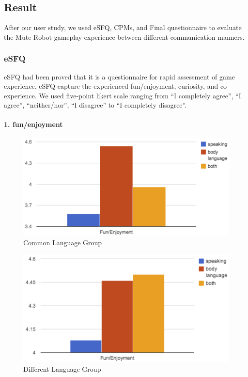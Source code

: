 \subsection{Result}
After our user study, we used eSFQ, CPMs, and Final questionnaire to evaluate the Mute Robot gameplay experience between different communication manners.

\subsubsection{eSFQ}
eSFQ\cite{eSFQ} had been proved that it is a questionnaire for rapid assessment of game experience. eSFQ capture the experienced fun/enjoyment, curiosity, and co-experience. We used five-point likert scale ranging from ``I completely agree'', ``I agree'', ``neither/nor'', ``I disagree'' to ``I completely disagree''.

\paragraph{1. fun/enjoyment}

\begin{figure}[!h]
\centering
\includegraphics[width=0.9\columnwidth]{Figures/US_Fun_Com.png}
\caption{Common Language Group}
\label{fig:US_Fun_Com}
\end{figure}

\begin{figure}[!h]
\centering
\includegraphics[width=0.9\columnwidth]{Figures/US_Fun_Dif.png}
\caption{Different Language Group}
\label{fig:US_Fun_Dif}
\end{figure}

